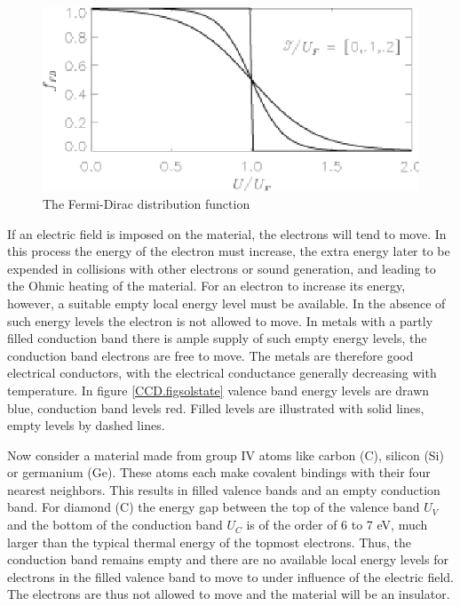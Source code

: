 \documentclass{article}
\begin{document}
\begin{figure}[h]
  \centering
	\includegraphics{CCD_fFD.eps}
  \caption{The Fermi-Dirac distribution function}
  \label{fig:CCD.figfFD}
\end{figure}

If an electric field is imposed on the material, the electrons will
tend to move. In this process the energy of the electron must
increase, the extra energy later to be expended in collisions with
other electrons or sound generation, and leading to the Ohmic heating
of the material. For an electron to increase its energy, however, a
suitable empty local energy level must be available. In the absence of
such energy levels the electron is not allowed to move. In metals with
a partly filled conduction band there is ample supply of such empty
energy levels, the conduction band electrons are free to move. The
metals are therefore good electrical conductors, with the electrical
conductance generally decreasing with temperature. In figure
\ref{CCD.figsolstate} valence band energy levels are drawn blue,
conduction band levels red. Filled levels are illustrated with
solid lines, empty levels by dashed lines. 


Now consider a material made from group IV atoms like carbon (C),
silicon (Si) or germanium (Ge).  These atoms each make covalent
bindings with their four nearest neighbors. This results in filled
valence bands and an empty conduction band.  For diamond (C) the
energy gap between the top of the valence band $U_V$ and the bottom of
the conduction band $U_C$ is of the order of 6 to 7 eV, much larger
than the typical thermal energy of the topmost electrons. Thus, the
conduction band remains empty and there are no available local energy
levels for electrons in the filled valence band to move to under
influence of the electric field. The electrons are thus not allowed to
move and the material will be an insulator.
\end{document}
